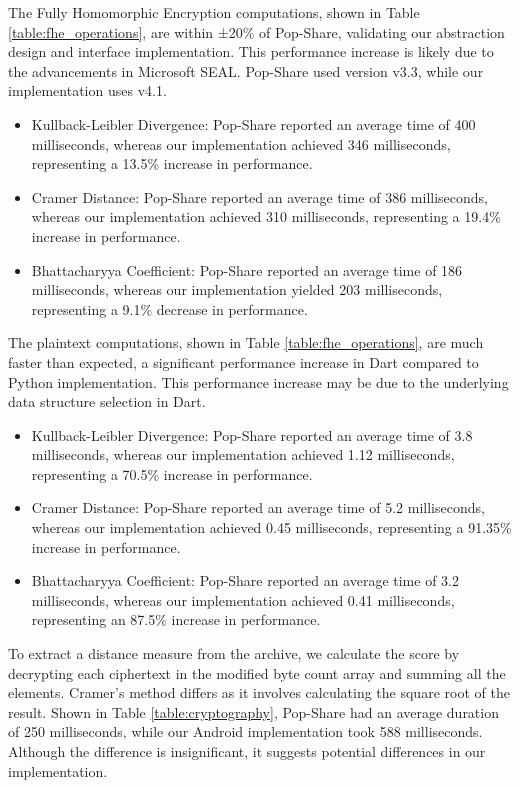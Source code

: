 

The Fully Homomorphic Encryption computations, shown in Table \ref{table:fhe_operations}, are within ±20\% of Pop-Share, validating our abstraction design and interface implementation. This performance increase is likely due to the advancements in Microsoft SEAL. Pop-Share used version v3.3, while our implementation uses v4.1.

\begin{itemize}
    \item Kullback-Leibler Divergence: Pop-Share reported an average time of 400 milliseconds, whereas our implementation achieved 346 milliseconds, representing a 13.5\% increase in performance.
    \item Cramer Distance: Pop-Share reported an average time of 386 milliseconds, whereas our implementation achieved 310 milliseconds, representing a 19.4\% increase in performance.
    \item Bhattacharyya Coefficient: Pop-Share reported an average time of 186 milliseconds, whereas our implementation yielded 203 milliseconds, representing a 9.1\% decrease in performance.
\end{itemize}



The plaintext computations, shown in Table \ref{table:fhe_operations}, are much faster than expected, a significant performance increase in Dart compared to Python implementation. This performance increase may be due to the underlying data structure selection in Dart.

\begin{itemize}
    \item Kullback-Leibler Divergence: Pop-Share reported an average time of 3.8 milliseconds, whereas our implementation achieved 1.12 milliseconds, representing a 70.5\% increase in performance.
    \item Cramer Distance: Pop-Share reported an average time of 5.2 milliseconds, whereas our implementation achieved 0.45 milliseconds, representing a 91.35\% increase in performance.
    \item Bhattacharyya Coefficient: Pop-Share reported an average time of 3.2 milliseconds, whereas our implementation achieved 0.41 milliseconds, representing an 87.5\% increase in performance.
\end{itemize}

To extract a distance measure from the archive, we calculate the score by decrypting each ciphertext in the modified byte count array and summing all the elements. Cramer's method differs as it involves calculating the square root of the result. Shown in Table \ref{table:cryptography}, Pop-Share had an average duration of 250 milliseconds, while our Android implementation took 588 milliseconds. Although the difference is insignificant, it suggests potential differences in our implementation.

